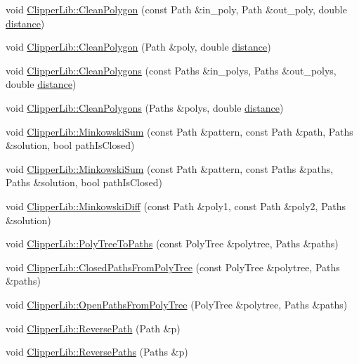 \begin{DoxyCompactItemize}
\item 
void \mbox{\hyperlink{namespace_clipper_lib_a9246a3146ac112581e82be58e158be7b}{Clipper\+Lib\+::\+Clean\+Polygon}} (const Path \&in\+\_\+poly, Path \&out\+\_\+poly, double \mbox{\hyperlink{unwrapping_8cc_abf82b59ef33c7549580276e00ae85d18}{distance}})
\item 
void \mbox{\hyperlink{namespace_clipper_lib_a819f3ac34feed7ca8c64c54bc534eb1b}{Clipper\+Lib\+::\+Clean\+Polygon}} (Path \&poly, double \mbox{\hyperlink{unwrapping_8cc_abf82b59ef33c7549580276e00ae85d18}{distance}})
\item 
void \mbox{\hyperlink{namespace_clipper_lib_a770cbc6ce4f16d02b8fe27c5abf6159c}{Clipper\+Lib\+::\+Clean\+Polygons}} (const Paths \&in\+\_\+polys, Paths \&out\+\_\+polys, double \mbox{\hyperlink{unwrapping_8cc_abf82b59ef33c7549580276e00ae85d18}{distance}})
\item 
void \mbox{\hyperlink{namespace_clipper_lib_aeee397f9f7e7cb5f0bb4723b7c4969e9}{Clipper\+Lib\+::\+Clean\+Polygons}} (Paths \&polys, double \mbox{\hyperlink{unwrapping_8cc_abf82b59ef33c7549580276e00ae85d18}{distance}})
\item 
void \mbox{\hyperlink{namespace_clipper_lib_ad12b5697c25579dce65d369a2e3cf608}{Clipper\+Lib\+::\+Minkowski\+Sum}} (const Path \&pattern, const Path \&path, Paths \&solution, bool path\+Is\+Closed)
\item 
void \mbox{\hyperlink{namespace_clipper_lib_ae4893aa579fd7c46ce695fd3d1c66e64}{Clipper\+Lib\+::\+Minkowski\+Sum}} (const Path \&pattern, const Paths \&paths, Paths \&solution, bool path\+Is\+Closed)
\item 
void \mbox{\hyperlink{namespace_clipper_lib_a76dac24102863220c7bc13be222a1dda}{Clipper\+Lib\+::\+Minkowski\+Diff}} (const Path \&poly1, const Path \&poly2, Paths \&solution)
\item 
void \mbox{\hyperlink{namespace_clipper_lib_a3713b024b773e4e041f3de4595ff0f77}{Clipper\+Lib\+::\+Poly\+Tree\+To\+Paths}} (const Poly\+Tree \&polytree, Paths \&paths)
\item 
void \mbox{\hyperlink{namespace_clipper_lib_a83f3a341799f94dd6bd9649b319d85fa}{Clipper\+Lib\+::\+Closed\+Paths\+From\+Poly\+Tree}} (const Poly\+Tree \&polytree, Paths \&paths)
\item 
void \mbox{\hyperlink{namespace_clipper_lib_aa8b0b36c4c1e8108f39b10e4fba81cc5}{Clipper\+Lib\+::\+Open\+Paths\+From\+Poly\+Tree}} (Poly\+Tree \&polytree, Paths \&paths)
\item 
void \mbox{\hyperlink{namespace_clipper_lib_ab6376320953c60093dc73462c74589e1}{Clipper\+Lib\+::\+Reverse\+Path}} (Path \&p)
\item 
void \mbox{\hyperlink{namespace_clipper_lib_ade103cad7caf2aa357b2d5410866ea62}{Clipper\+Lib\+::\+Reverse\+Paths}} (Paths \&p)
\end{DoxyCompactItemize}
